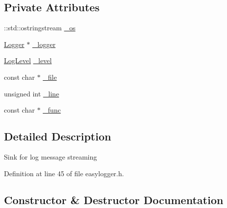 \subsection*{Private Attributes}
\begin{DoxyCompactItemize}
\item 
\+::std\+::ostringstream \mbox{\hyperlink{classeasylogger_1_1__private_1_1_log_sink_aa75fd29fc9b5f119faf3cf98972c7992}{\+\_\+os}}
\item 
\mbox{\hyperlink{classeasylogger_1_1_logger}{Logger}} $\ast$ \mbox{\hyperlink{classeasylogger_1_1__private_1_1_log_sink_a60f3bf0555fd5c7d97b27749d87f125b}{\+\_\+logger}}
\item 
\mbox{\hyperlink{namespaceeasylogger_a68cb882ead21af982c40e3621fcd50b0}{Log\+Level}} \mbox{\hyperlink{classeasylogger_1_1__private_1_1_log_sink_aa95e04bfd9dddc7bb38fcfb9b2033d91}{\+\_\+level}}
\item 
const char $\ast$ \mbox{\hyperlink{classeasylogger_1_1__private_1_1_log_sink_a9496a68363124d15396253627d2702bb}{\+\_\+file}}
\item 
unsigned int \mbox{\hyperlink{classeasylogger_1_1__private_1_1_log_sink_a66cce9a59d42737916fba00a549fd4ef}{\+\_\+line}}
\item 
const char $\ast$ \mbox{\hyperlink{classeasylogger_1_1__private_1_1_log_sink_a147321aae0346917642528aa81aedf32}{\+\_\+func}}
\end{DoxyCompactItemize}


\subsection{Detailed Description}
Sink for log message streaming 

Definition at line 45 of file easylogger.\+h.



\subsection{Constructor \& Destructor Documentation}
\mbox{\label{classeasylogger_1_1__private_1_1_log_sink_a3b9242d120d168d80ec77d4941588a6e}} 
